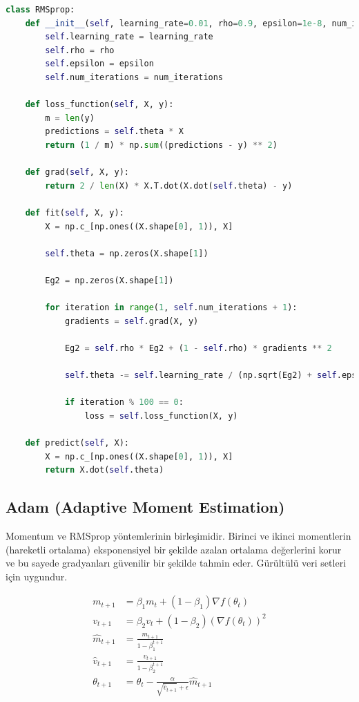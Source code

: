 \begin{lstlisting}[language=Python]
class RMSprop:
    def __init__(self, learning_rate=0.01, rho=0.9, epsilon=1e-8, num_iterations=1000):
        self.learning_rate = learning_rate
        self.rho = rho
        self.epsilon = epsilon
        self.num_iterations = num_iterations

    def loss_function(self, X, y):
        m = len(y)
        predictions = self.theta * X
        return (1 / m) * np.sum((predictions - y) ** 2)

    def grad(self, X, y):
        return 2 / len(X) * X.T.dot(X.dot(self.theta) - y)
    
    def fit(self, X, y):
        X = np.c_[np.ones((X.shape[0], 1)), X]

        self.theta = np.zeros(X.shape[1])

        Eg2 = np.zeros(X.shape[1])

        for iteration in range(1, self.num_iterations + 1):
            gradients = self.grad(X, y)

            Eg2 = self.rho * Eg2 + (1 - self.rho) * gradients ** 2

            self.theta -= self.learning_rate / (np.sqrt(Eg2) + self.epsilon) * gradients

            if iteration % 100 == 0:
                loss = self.loss_function(X, y)

    def predict(self, X):
        X = np.c_[np.ones((X.shape[0], 1)), X]
        return X.dot(self.theta)
\end{lstlisting}

\newpage

\subsection{Adam (Adaptive Moment Estimation)}
Momentum ve RMSprop yöntemlerinin birleşimidir. Birinci ve ikinci momentlerin (hareketli ortalama) eksponensiyel bir şekilde azalan ortalama değerlerini korur ve bu sayede gradyanları güvenilir bir şekilde tahmin eder. Gürültülü veri setleri için uygundur.

\begin{align*}
m_{t+1} & = \beta_{1}m_{t} + (1 - \beta_{1})\nabla f(\theta_{t}) \\
v_{t+1} & = \beta_{2}v_{t} + (1 - \beta_{2})(\nabla f(\theta_{t}))^2 \\
\hat{m}_{t+1} & = \frac{m_{t+1}}{1 - \beta_{1}^{t+1}} \\
\hat{v}_{t+1} & = \frac{v_{t+1}}{1 - \beta_{2}^{t+1}} \\
\theta_{t+1} & = \theta_{t} - \frac{\alpha}{\sqrt{\hat{v}_{t+1}} + \epsilon} \hat{m}_{t+1}
\end{align*}

